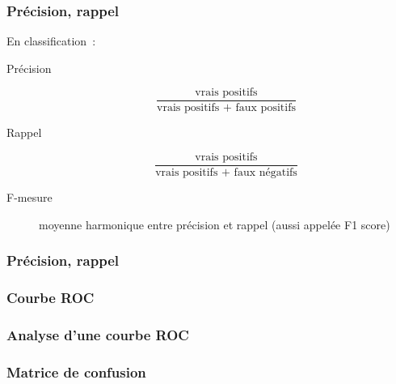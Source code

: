 \begin{frame}
  \frametitle{Précision, rappel}
  En classification :
  \begin{description}
  \item[Précision]
    \[
    \frac{\text{vrais positifs}}{\text{vrais positifs + faux positifs}}
    \]
  \item[Rappel]
    \[
    \frac{\text{vrais positifs}}{\text{vrais positifs + faux négatifs}}
  \]
  \item[F-mesure] moyenne harmonique entre précision et rappel (aussi
    appelée F1 score)
  \end{description}
\end{frame}

\begin{frame}
  \frametitle{Précision, rappel}
\end{frame}

\begin{frame}
  \frametitle{Courbe ROC}
\end{frame}

\begin{frame}
  \frametitle{Analyse d'une courbe ROC}
\end{frame}

\begin{frame}
  \frametitle{Matrice de confusion}
\end{frame}
